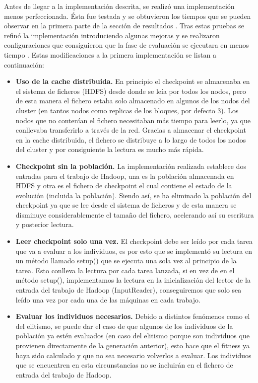 Antes de llegar a la implementaci\'on descrita, se realiz\'o una implementación menos perfeccionada. \'Esta fue testada y se obtuvieron los tiempos que se pueden observar en la primera parte de la sección de resultados . Tras estas pruebas se refin\'o la implementación introduciendo algunas mejoras y se realizaron configuraciones que consiguieron que la fase de evaluación se ejecutara en menos tiempo . Estas modificaciones a la primera implementación se listan a continuación:
\label{mejoras}

\begin{itemize}
	\item \textbf{Uso de la cache distribuida.} En principio el checkpoint se almacenaba en el sistema de ficheros (HDFS) desde donde se leía por todos los nodos, pero de esta manera el fichero estaba solo almacenado en algunos de los nodos del cluster (en tantos nodos como replicas de los bloques, por defecto 3). Los nodos que no contenían el fichero necesitaban m\'as tiempo para leerlo, ya que conllevaba transferirlo a través de la red. Gracias a almacenar el checkpoint en la cache distribuida, el fichero se distribuye a lo largo de todos los nodos del cluster y por consiguiente la lectura es mucho m\'as rápida.
	\item \textbf{Checkpoint sin la población.} La implementación realizada establece dos entradas para el trabajo de Hadoop, una es la población almacenada en HDFS y otra es el fichero de checkpoint el cual contiene el estado de la evolución (incluida la población). Siendo así, se ha eliminado la población del checkpoint ya que se lee desde el sistema de ficheros y de esta manera se disminuye considerablemente el tamaño del fichero, acelerando as\'i su escritura y posterior lectura.
	\item \textbf{Leer checkpoint solo una vez.} El checkpoint debe ser leído por cada tarea que va a evaluar a los individuos, es por esto que se implement\'o su lectura en un método llamado setup() que se ejecuta una sola vez al principio de la tarea. Esto conlleva la lectura por cada tarea lanzada, si en vez de en el método setup(), implementamos la lectura en la inicializaci\'on del lector de la entrada del trabajo de Hadoop (InputReader), conseguiremos que solo sea leído una vez por cada una de las m\'aquinas en cada trabajo.
	\item \textbf{Evaluar los individuos necesarios.} Debido a distintos fenómenos como el del elitismo, se puede dar el caso de que algunos de los individuos de la población ya est\'en evaluados (en caso del elitismo porque son individuos que provienen directamente de la generaci\'on anterior), esto hace que el fitness ya haya sido calculado y que no sea necesario volverlos a evaluar. Los individuos que se encuentren en esta circunstancias no se incluirán en el fichero de entrada del trabajo de Hadoop.		

\end{itemize}
